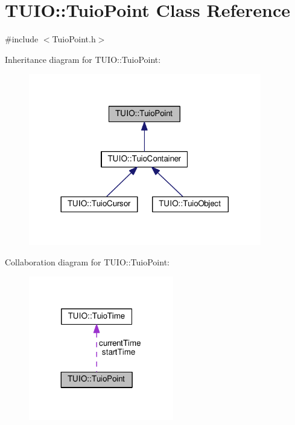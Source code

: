\hypertarget{class_t_u_i_o_1_1_tuio_point}{}\section{T\+U\+IO\+:\+:Tuio\+Point Class Reference}
\label{class_t_u_i_o_1_1_tuio_point}


{\ttfamily \#include $<$Tuio\+Point.\+h$>$}



Inheritance diagram for T\+U\+IO\+:\+:Tuio\+Point\+:\nopagebreak
\begin{figure}[H]
\begin{center}
\leavevmode
\includegraphics[width=288pt]{class_t_u_i_o_1_1_tuio_point__inherit__graph}
\end{center}
\end{figure}


Collaboration diagram for T\+U\+IO\+:\+:Tuio\+Point\+:\nopagebreak
\begin{figure}[H]
\begin{center}
\leavevmode
\includegraphics[width=179pt]{class_t_u_i_o_1_1_tuio_point__coll__graph}
\end{center}
\end{figure}
